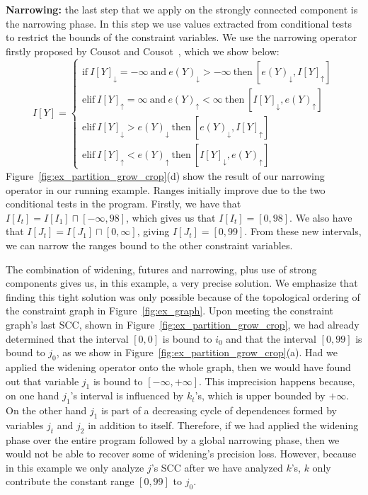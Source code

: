 \documentclass[preprint]{sigplanconf}[10pt]
\newcommand{\lb}[1]{#1_{\downarrow}}
\newcommand{\ub}[1]{#1_{\uparrow}}
\begin{document}
\noindent
\textbf{Narrowing: } the last step that we apply on the strongly connected
component is the narrowing phase.
In this step we use values extracted from conditional tests to restrict the
bounds of the constraint variables.
We use the narrowing operator firstly proposed by Cousot and
Cousot~\cite{Cousot77}, which we show below:
%
\begin{equation*}
I[Y] =
\begin{cases}
\mbox{if} \ \lb{I[Y]} = -\infty  \ \mbox{and} \ \lb{e(Y)} > -\infty \ \mbox{then} \ [\lb{e(Y)}, \ub{I[Y]}] \\
\mbox{elif} \ \ub{I[Y]} = \infty \ \mbox{and} \ \ub{e(Y)} < \infty \ \mbox{then}
\ [\lb{I[Y]}, \ub{e(Y)}] \\
\mbox{elif} \ \lb{I[Y]} > \lb{e(Y)} \ \mbox{then} \ [\lb{e(Y)}, \ub{I[Y]}] \\
\mbox{elif} \ \ub{I[Y]} < \ub{e(Y)} \ \mbox{then} \ [\lb{I[Y]}, \ub{e(Y)}]
\end{cases}
\end{equation*}
%
Figure~\ref{fig:ex_partition_grow_crop}(d) show the result of our narrowing
operator in our running example.
Ranges initially improve due to the two conditional tests in the program.
Firstly, we have that $I[I_t] = I[I_1] \sqcap [-\infty, 98]$, which gives us
that $I[I_t] = [0, 98]$.
We also have that $I[J_t] = I[J_1] \sqcap [0, \infty]$, giving
$I[J_t] = [0, 99]$.
From these new intervals, we can narrow the ranges bound to the other constraint
variables.

The combination of widening, futures and narrowing, plus use of strong components
gives us, in this example, a very precise solution.
We emphasize that finding this tight solution was only possible because of
the topological ordering of the constraint graph in Figure~\ref{fig:ex_graph}.
Upon meeting the constraint graph's last SCC, shown in
Figure~\ref{fig:ex_partition_grow_crop}, we had already determined that the
interval $[0, 0]$ is bound to $i_0$ and that the interval $[0, 99]$ is bound to
$j_0$, as we show in Figure~\ref{fig:ex_partition_grow_crop}(a).
Had we applied the widening operator onto the whole graph, then we would
have found out that variable $j_1$ is bound to $[-\infty, +\infty]$.
This imprecision happens because, on one hand $j_1$'s interval is influenced
by $k_t$'s, which is upper bounded by $+\infty$.
On the other hand $j_1$ is part of a decreasing cycle of dependences formed by
variables $j_t$ and $j_2$ in addition to itself.
Therefore, if we had applied the widening phase over the entire program followed
by a global narrowing phase, then we would not be able to recover some of
widening's precision loss.
However, because in this example we only analyze $j$'s SCC after we have
analyzed $k$'s, $k$ only contribute the constant range $[0, 99]$ to $j_0$.
\end{document}
